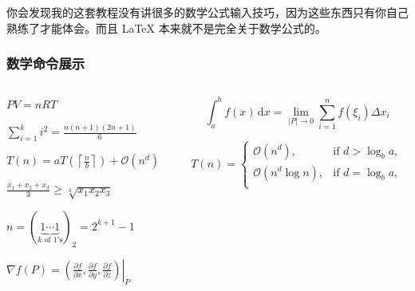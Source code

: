 \begin{shadedsection}
\begin{frame}
{  你会发现我的这套教程没有讲很多的数学公式输入技巧，因为这些东西只有你自己熟练了才能体会。而且 \LaTeX{} 本来就不是完全关于数学公式的。}
\end{frame}

\begin{frame}
  \frametitle{数学命令展示}
  \begin{columns}
    \begin{column}{0.33\textwidth}
      \begin{exampleblock}{}
        $PV=nRT$
      \end{exampleblock}
      \begin{exampleblock}{}
        $\sum_{i=1}^ki^2=\frac{n(n+1)(2n+1)}{6}$
      \end{exampleblock}
      \begin{exampleblock}{}
        $T(n) = aT\left(\left\lceil\frac{n}{b}\right\rceil\right) + \mathcal{O}(n^d)$
      \end{exampleblock}
      \begin{exampleblock}{}
        $\frac{x_{1}+x_{2}+x_{3}}{3}\geq \sqrt[3]{x_{1}x_{2}x_{3}}$
      \end{exampleblock}
      \begin{exampleblock}{}
        $n=(\underbrace{1\cdots 1}_{k\text{ of 1's}})_2=2^{k+1}-1$
      \end{exampleblock}
      \begin{exampleblock}{}
        $\nabla f (P)= \left.\left(\frac{\partial f}{\partial x},\frac{\partial f}{\partial y},\frac{\partial f}{\partial z}\right)\right|_{P}$
      \end{exampleblock}
    \end{column}
    \begin{column}{0.67\textwidth}
      \begin{exampleblock}{}
        \begin{equation*}
          \int_{a}^b f(x)\,\mathrm{d}x=\lim_{|P|\rightarrow 0}\sum_{i=1}^n f(\xi_i)\Delta x_i
        \end{equation*}
      \end{exampleblock}
      \begin{exampleblock}{}
        \begin{equation}
          T(n) = \begin{cases}
            \mathcal{O}(n^d),&\textrm{if } d>\log_b a, \\
            \mathcal{O}(n^d\log n), &\textrm{if } d=\log_b a,\\

\end{cases}
\end{equation}
\end{exampleblock}
\end{column}
\end{columns}
\end{frame}
\end{shadedsection}
